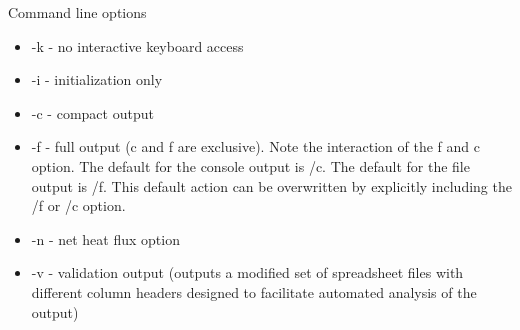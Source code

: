 Command line options

\begin{itemize}
\item -k - no interactive keyboard access
\item -i - initialization only
\item -c - compact output
\item -f - full output (c and f are exclusive). Note the interaction of the f and c option. The default for the console output is /c. The default for the file output is /f. This default action can be overwritten by explicitly including the /f or /c option.
\item -n - net heat flux option
\item -v - validation output (outputs a modified set of spreadsheet files with different column headers designed to facilitate automated analysis of the output)
\end{itemize}


\label{last_page}

